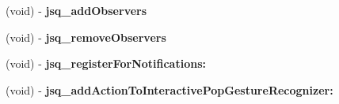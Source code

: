 \begin{DoxyCompactItemize}
\item 
\hypertarget{category_j_s_q_messages_view_controller_07_08_a6e61ead9ee7cc335ccbdfd0a3c93c682}{}(void) -\/ {\bfseries jsq\+\_\+add\+Observers}\label{category_j_s_q_messages_view_controller_07_08_a6e61ead9ee7cc335ccbdfd0a3c93c682}

\item 
\hypertarget{category_j_s_q_messages_view_controller_07_08_ad4762f2c2dff0742ae4e0d13d012baff}{}(void) -\/ {\bfseries jsq\+\_\+remove\+Observers}\label{category_j_s_q_messages_view_controller_07_08_ad4762f2c2dff0742ae4e0d13d012baff}

\item 
\hypertarget{category_j_s_q_messages_view_controller_07_08_ae9a0d09cfed964672490e5ce02b48bee}{}(void) -\/ {\bfseries jsq\+\_\+register\+For\+Notifications\+:}\label{category_j_s_q_messages_view_controller_07_08_ae9a0d09cfed964672490e5ce02b48bee}

\item 
\hypertarget{category_j_s_q_messages_view_controller_07_08_aa2b3c82a704fc88edb4212286ca867e0}{}(void) -\/ {\bfseries jsq\+\_\+add\+Action\+To\+Interactive\+Pop\+Gesture\+Recognizer\+:}\label{category_j_s_q_messages_view_controller_07_08_aa2b3c82a704fc88edb4212286ca867e0}

\end{DoxyCompactItemize}
